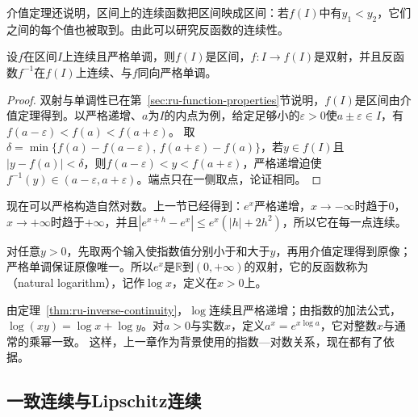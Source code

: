 介值定理还说明，区间上的连续函数把区间映成区间：若$f(I)$中有$y_1<y_2$，它们之间的每个值也被取到。由此可以研究反函数的连续性。
\begin{theorem}[严格单调连续函数的反函数]
\label{thm:ru-inverse-continuity}
\label{sec:analysis-inverse-continuity}
设$f$在区间$I$上连续且严格单调，则$f(I)$是区间，$f:I\to f(I)$是双射，并且反函数$f^{-1}$在$f(I)$上连续、与$f$同向严格单调。
\end{theorem}
\begin{proof}
双射与单调性已在第~\ref{sec:ru-function-properties}节说明，$f(I)$是区间由介值定理得到。以严格递增、$a$为$I$的内点为例，给定足够小的$\varepsilon>0$使$a\pm\varepsilon\in I$，有$f(a-\varepsilon)<f(a)<f(a+\varepsilon)$。
取$\delta=\min\{f(a)-f(a-\varepsilon),\,f(a+\varepsilon)-f(a)\}$，若$y\in f(I)$且$|y-f(a)|<\delta$，则$f(a-\varepsilon)<y<f(a+\varepsilon)$，严格递增迫使$f^{-1}(y)\in(a-\varepsilon,a+\varepsilon)$。端点只在一侧取点，论证相同。
\end{proof}

现在可以严格构造自然对数。上一节已经得到：$e^x$严格递增，$x\to-\infty$时趋于$0$，$x\to+\infty$时趋于$+\infty$，并且$|e^{x+h}-e^x|\leq e^x(|h|+2h^2)$，所以它在每一点连续。

对任意$y>0$，先取两个输入使指数值分别小于和大于$y$，再用介值定理得到原像；严格单调保证原像唯一。所以$e^x$是$\mathbb R$到$(0,+\infty)$的双射，它的反函数称为（natural logarithm），记作$\log x$，定义在$x>0$上。

由定理~\ref{thm:ru-inverse-continuity}，$\log$连续且严格递增；由指数的加法公式，$\log(xy)=\log x+\log y$。对$a>0$与实数$x$，定义$a^x=e^{x\log a}$，它对整数$x$与通常的乘幂一致。
这样，上一章作为背景使用的指数—对数关系，现在都有了依据。

\subsection{一致连续与Lipschitz连续}
\label{sec:ru-uniform-lipschitz}
\label{sec:analysis-continuity-relations}

